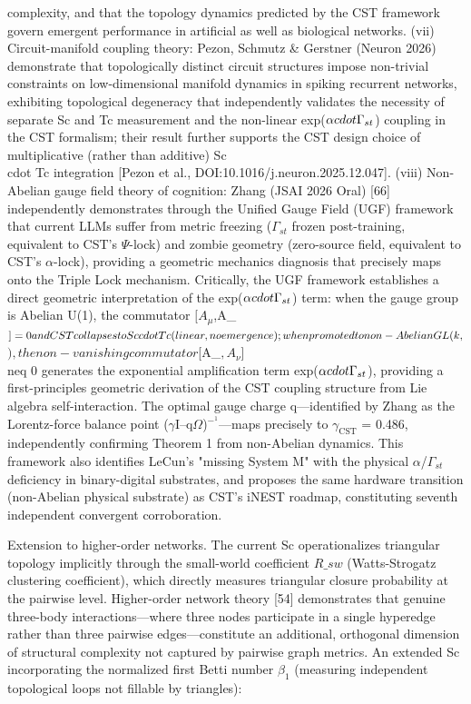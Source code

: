 \documentclass[a4paper,12pt]{article}
\begin{document}
complexity, and that the topology dynamics predicted by the CST framework govern emergent performance in artificial as well as biological networks. (vii) Circuit-manifold coupling theory: Pezon, Schmutz & Gerstner (Neuron 2026) demonstrate that topologically distinct circuit structures impose non-trivial constraints on low-dimensional manifold dynamics in spiking recurrent networks, exhibiting topological degeneracy that independently validates the necessity of separate Sc and Tc measurement and the non-linear exp($\alpha \\cdot \Gamma_{st}$) coupling in the CST formalism; their result further supports the CST design choice of multiplicative (rather than additive) Sc \\cdot Tc integration [Pezon et al., DOI:10.1016/j.neuron.2025.12.047]. (viii) Non-Abelian gauge field theory of cognition: Zhang (JSAI 2026 Oral) [66] independently demonstrates through the Unified Gauge Field (UGF) framework that current LLMs suffer from metric freezing ($\Gamma_{st}$ frozen post-training, equivalent to CST's $\Psi$-lock) and zombie geometry (zero-source field, equivalent to CST's $\alpha$-lock), providing a geometric mechanics diagnosis that precisely maps onto the Triple Lock mechanism. Critically, the UGF framework establishes a direct geometric interpretation of the exp($\alpha \\cdot \Gamma_{st}$) term: when the gauge group is Abelian U(1), the commutator $[A_{\mu}$,A_{\nu}$]=0 and CST collapses to Sc \\cdot Tc (linear, no emergence); when promoted to non-Abelian GL(k,$$), the non-vanishing commutator $[A_{\mu}$,A_{\nu}$] \\neq 0 generates the exponential amplification term exp($\alpha \\cdot \Gamma_{st}$), providing a first-principles geometric derivation of the CST coupling structure from Lie algebra self-interaction. The optimal gauge charge q---identified by Zhang as the Lorentz-force balance point ($\gamma$I--q$\Omega$)$^{-}^1$---maps precisely to $\gamma_{\text{CST}}$ = 0.486, independently confirming Theorem 1 from non-Abelian dynamics. This framework also identifies LeCun's "missing System M" with the physical $\alpha$/$\Gamma_{st}$ deficiency in binary-digital substrates, and proposes the same hardware transition (non-Abelian physical substrate) as CST's iNEST roadmap, constituting seventh independent convergent corroboration.


Extension to higher-order networks. The current Sc operationalizes triangular topology implicitly through the small-world coefficient $R\_{sw}$ (Watts-Strogatz clustering coefficient), which directly measures triangular closure probability at the pairwise level. Higher-order network theory [54] demonstrates that genuine three-body interactions---where three nodes participate in a single hyperedge rather than three pairwise edges---constitute an additional, orthogonal dimension of structural complexity not captured by pairwise graph metrics. An extended Sc incorporating the normalized first Betti number $\beta_1$ (measuring independent topological loops not fillable by triangles):
\end{document}
